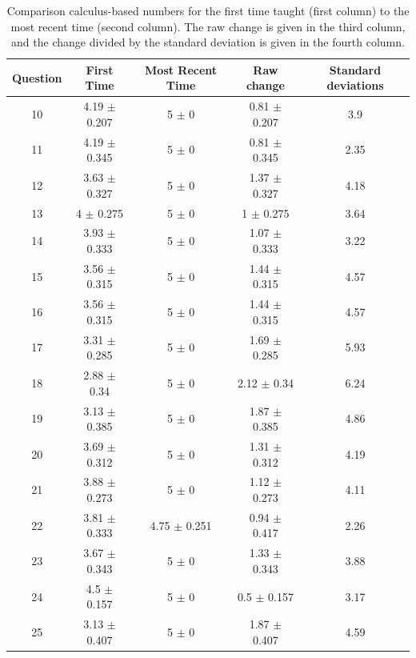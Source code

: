 \documentclass[../../main.tex]{subfiles}
\begin{document}
\begin{table}
\small
\centering
\begin{tabular}{| c | c | c | c | c |}
\hline
\hline
Question & First Time & Most Recent Time & Raw change & Standard deviations \\
\hline
10 & 4.19 $\pm$ 0.207 & 5 $\pm$ 0 & 0.81 $\pm$ 0.207 & 3.9 \\ \hline
11 & 4.19 $\pm$ 0.345 & 5 $\pm$ 0 & 0.81 $\pm$ 0.345 & 2.35 \\ \hline
12 & 3.63 $\pm$ 0.327 & 5 $\pm$ 0 & 1.37 $\pm$ 0.327 & 4.18 \\ \hline
13 & 4 $\pm$ 0.275 & 5 $\pm$ 0 & 1 $\pm$ 0.275 & 3.64 \\ \hline
14 & 3.93 $\pm$ 0.333 & 5 $\pm$ 0 & 1.07 $\pm$ 0.333 & 3.22 \\ \hline
15 & 3.56 $\pm$ 0.315 & 5 $\pm$ 0 & 1.44 $\pm$ 0.315 & 4.57 \\ \hline
16 & 3.56 $\pm$ 0.315 & 5 $\pm$ 0 & 1.44 $\pm$ 0.315 & 4.57 \\ \hline
17 & 3.31 $\pm$ 0.285 & 5 $\pm$ 0 & 1.69 $\pm$ 0.285 & 5.93 \\ \hline
18 & 2.88 $\pm$ 0.34 & 5 $\pm$ 0 & 2.12 $\pm$ 0.34 & 6.24 \\ \hline
19 & 3.13 $\pm$ 0.385 & 5 $\pm$ 0 & 1.87 $\pm$ 0.385 & 4.86 \\ \hline
20 & 3.69 $\pm$ 0.312 & 5 $\pm$ 0 & 1.31 $\pm$ 0.312 & 4.19 \\ \hline
21 & 3.88 $\pm$ 0.273 & 5 $\pm$ 0 & 1.12 $\pm$ 0.273 & 4.11 \\ \hline
22 & 3.81 $\pm$ 0.333 & 4.75 $\pm$ 0.251 & 0.94 $\pm$ 0.417 & 2.26 \\ \hline
23 & 3.67 $\pm$ 0.343 & 5 $\pm$ 0 & 1.33 $\pm$ 0.343 & 3.88 \\ \hline
24 & 4.5 $\pm$ 0.157 & 5 $\pm$ 0 & 0.5 $\pm$ 0.157 & 3.17 \\ \hline
25 & 3.13 $\pm$ 0.407 & 5 $\pm$ 0 & 1.87 $\pm$ 0.407 & 4.59 \\ \hline
\hline
\end{tabular}
\caption{\label{tab:courses:intro_shifts_2} Comparison calculus-based numbers for the first time taught (first column) to the most recent time (second column). The raw change is given in the third column, and the change divided by the standard deviation is given in the fourth column.}
\end{table}
\end{document}
